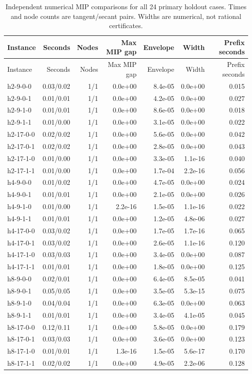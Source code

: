 \begin{longtable}{lrrrrrr}
\caption{Independent numerical MIP comparisons for all 24 primary holdout cases. Times and node counts are tangent/secant pairs. Widths are numerical, not rational certificates.}\label{tab:r46-mip}\\
\toprule Instance & Seconds & Nodes & Max MIP gap & Envelope & Width & Prefix seconds \\\midrule\endfirsthead
\toprule Instance & Seconds & Nodes & Max MIP gap & Envelope & Width & Prefix seconds \\\midrule\endhead
h2-9-0-0 & 0.03/0.02 & 1/1 & 0.0e+00 & 8.4e-05 & 0.0e+00 & 0.015 \\
h2-9-0-1 & 0.01/0.01 & 1/1 & 0.0e+00 & 4.2e-05 & 0.0e+00 & 0.027 \\
h2-9-1-0 & 0.01/0.01 & 1/1 & 0.0e+00 & 8.6e-05 & 0.0e+00 & 0.018 \\
h2-9-1-1 & 0.01/0.00 & 1/1 & 0.0e+00 & 3.1e-05 & 0.0e+00 & 0.022 \\
h2-17-0-0 & 0.02/0.02 & 1/1 & 0.0e+00 & 5.6e-05 & 0.0e+00 & 0.042 \\
h2-17-0-1 & 0.02/0.02 & 1/1 & 0.0e+00 & 2.8e-05 & 0.0e+00 & 0.043 \\
h2-17-1-0 & 0.01/0.00 & 1/1 & 0.0e+00 & 3.3e-05 & 1.1e-16 & 0.040 \\
h2-17-1-1 & 0.01/0.00 & 1/1 & 0.0e+00 & 1.7e-04 & 2.2e-16 & 0.056 \\
h4-9-0-0 & 0.01/0.02 & 1/1 & 0.0e+00 & 4.7e-05 & 0.0e+00 & 0.024 \\
h4-9-0-1 & 0.01/0.01 & 1/1 & 0.0e+00 & 2.1e-05 & 0.0e+00 & 0.026 \\
h4-9-1-0 & 0.01/0.00 & 1/1 & 2.2e-16 & 1.5e-05 & 1.1e-16 & 0.022 \\
h4-9-1-1 & 0.01/0.01 & 1/1 & 0.0e+00 & 1.2e-05 & 4.8e-06 & 0.027 \\
h4-17-0-0 & 0.03/0.02 & 1/1 & 0.0e+00 & 1.7e-05 & 1.7e-16 & 0.065 \\
h4-17-0-1 & 0.03/0.02 & 1/1 & 0.0e+00 & 2.6e-05 & 1.1e-16 & 0.120 \\
h4-17-1-0 & 0.03/0.03 & 1/1 & 0.0e+00 & 3.4e-05 & 0.0e+00 & 0.087 \\
h4-17-1-1 & 0.01/0.01 & 1/1 & 0.0e+00 & 1.8e-05 & 0.0e+00 & 0.125 \\
h8-9-0-0 & 0.02/0.01 & 1/1 & 0.0e+00 & 6.4e-05 & 8.5e-05 & 0.041 \\
h8-9-0-1 & 0.05/0.05 & 1/1 & 0.0e+00 & 3.5e-05 & 5.3e-15 & 0.075 \\
h8-9-1-0 & 0.04/0.04 & 1/1 & 0.0e+00 & 6.3e-05 & 0.0e+00 & 0.063 \\
h8-9-1-1 & 0.01/0.01 & 1/1 & 0.0e+00 & 3.4e-05 & 4.1e-05 & 0.045 \\
h8-17-0-0 & 0.12/0.11 & 1/1 & 0.0e+00 & 5.8e-05 & 0.0e+00 & 0.179 \\
h8-17-0-1 & 0.03/0.03 & 1/1 & 0.0e+00 & 3.6e-05 & 0.0e+00 & 0.123 \\
h8-17-1-0 & 0.01/0.01 & 1/1 & 1.3e-16 & 1.5e-05 & 5.6e-17 & 0.170 \\
h8-17-1-1 & 0.02/0.02 & 1/1 & 0.0e+00 & 4.9e-05 & 2.2e-06 & 0.128 \\
\bottomrule\end{longtable}
